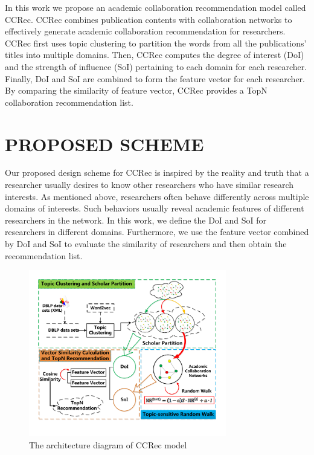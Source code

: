 \documentclass{acm_proc_article-sp}
\begin{document}
In this work we propose an academic collaboration recommendation model called CCRec. CCRec combines publication contents with collaboration networks to effectively generate academic collaboration recommendation for researchers. CCRec first uses topic clustering to partition the words from all the publications' titles into multiple domains. Then, CCRec computes the degree of interest (DoI) and the strength of influence (SoI) pertaining to each domain for each researcher. Finally, DoI and SoI are combined to form the feature vector for each researcher. By comparing the similarity of feature vector, CCRec provides a TopN collaboration recommendation list.

\section{PROPOSED SCHEME}
Our proposed design scheme for CCRec is inspired by the reality and truth that a researcher usually desires to know other researchers who have similar research interests. As mentioned above, researchers often behave differently across multiple domains of interests. Such behaviors usually reveal academic features of different researchers in the network. In this work, we define the DoI and SoI for researchers in different domains. Furthermore, we use the feature vector combined by DoI and SoI to evaluate the similarity of researchers and then obtain the recommendation list.


\begin{figure}
\centering
\includegraphics [width=3.4in]{Fig1.pdf}
\caption{The architecture diagram of CCRec model}
\end{figure}
\end{document}
